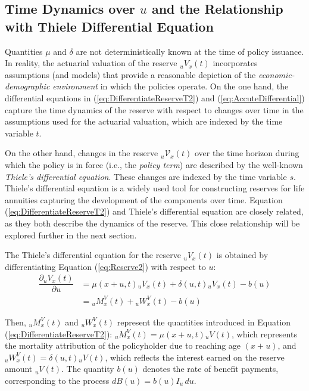 \documentclass[12pt]{article}
\begin{document}
\subsection{Time Dynamics over $u$ and the Relationship with Thiele Differential Equation}\label{sec:ThieleEquations}


Quantities \( \mu \) and \( \delta \) are not deterministically known at the time of policy issuance. In reality, the actuarial valuation of the reserve \( {}_uV_x(t) \) incorporates assumptions (and models) that provide a reasonable depiction of the \textit{economic-demographic environment} in which the policies operate. On the one hand, the differential equations in (\ref{eq:DifferentiateReserveT2}) and (\ref{eq:AccuteDifferential}) capture the time dynamics of the reserve with respect to changes over time in the assumptions used for the actuarial valuation, which are indexed by the time variable \( t \).

On the other hand, changes in the reserve \( {}_u\mathcal{V}_x(t) \) over the time horizon during which the policy is in force (i.e., the \textit{policy term}) are described by the well-known \textit{Thiele's differential equation}. These changes are indexed by the time variable \( s \). Thiele's differential equation is a widely used tool for constructing reserves for life annuities capturing the development of the components over time. Equation (\ref{eq:DifferentiateReserveT2}) and Thiele's differential equation are closely related, as they both describe the dynamics of the reserve. This close relationship will be explored further in the next section.

The Thiele's differential equation for the reserve \( {}_uV_x(t) \) is obtained by differentiating Equation (\ref{eq:Reserve2}) with respect to \( u \):
\begin{equation}\label{eq:Thiele}
	\begin{split}
		\dfrac{\partial {}_uV_x(t)}{\partial u}&= \mu(x+u,t){}_uV_x(t) + \delta(u,t){}_uV_x(t) - b(u) \\
		&= {}_uM^V_x(t) + {}_uW^V_x(t) - b(u)
	\end{split}
\end{equation}

Then, ${}_uM^V_x(t)$ and ${}_uW^V_x(t)$ represent the quantities introduced in Equation (\ref{eq:DifferentiateReserveT2}): ${}_uM^V_x(t) = \mu(x+u,t){}_uV(t)$, which represents the mortality attribution of the policyholder due to reaching age \( (x+u) \), and ${}_uW^V_x(t) = \delta(u,t){}_uV(t)$, which reflects the interest earned on the reserve amount ${}_uV(t)$. The quantity \( b(u) \) denotes the rate of benefit payments, corresponding to the process \( dB(u) = b(u) I_{u} \, du \).
\end{document}
